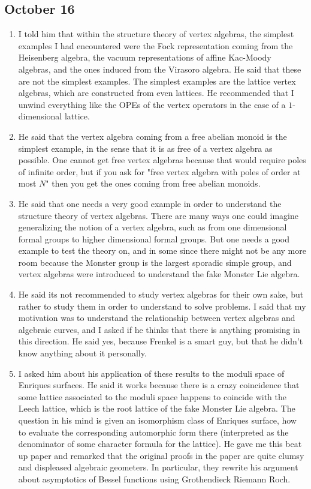 \documentclass[12pt]{article}
\begin{document}
\subsection*{October 16}
\begin{enumerate}
    \item I told him that within the structure theory of vertex algebras, the simplest examples I had encountered were the Fock representation coming from the Heisenberg algebra, the vacuum representations of affine Kac-Moody algebras, and the ones induced from the Virasoro algebra. He said that these are not the simplest examples. The simplest examples are the lattice vertex algebras, which are constructed from even lattices. He recommended that I unwind everything like the OPEs of the vertex operators in the case of a $1$-dimensional lattice.
    \item He said that the vertex algebra coming from a free abelian monoid is the simplest example, in the sense that it is as free of a vertex algebra as possible. One cannot get free vertex algebras because that would require poles of infinite order, but if you ask for "free vertex algebra with poles of order at most $N$" then you get the ones coming from free abelian monoids.
    \item He said that one needs a very good example in order to understand the structure theory of vertex algebras. There are many ways one could imagine generalizing the notion of a vertex algebra, such as from one dimensional formal groups to higher dimensional formal groups. But one needs a good example to test the theory on, and in some since there might not be any more room because the Monster group is the largest sporadic simple group, and vertex algebras were introduced to understand the fake Monster Lie algebra.
    \item He said its not recommended to study vertex algebras for their own sake, but rather to study them in order to understand to solve problems. I said that my motivation was to understand the relationship between vertex algebras and algebraic curves, and I asked if he thinks that there is anything promising in this direction. He said yes, because Frenkel is a smart guy, but that he didn't know anything about it personally.
    \item I asked him about his application of these results to the moduli space of Enriques surfaces. He said it works because there is a crazy coincidence that some lattice associated to the moduli space happens to coincide with the Leech lattice, which is the root lattice of the fake Monster Lie algebra. The question in his mind is given an isomorphism class of Enriques surface, how to evaluate the corresponding automorphic form there (interpreted as the denominator of some character formula for the lattice). He gave me this beat up paper and remarked that the original proofs in the paper are quite clumsy and displeased algebraic geometers. In particular, they rewrite his argument about asymptotics of Bessel functions using Grothendieck Riemann Roch.
\end{enumerate}
\end{document}
